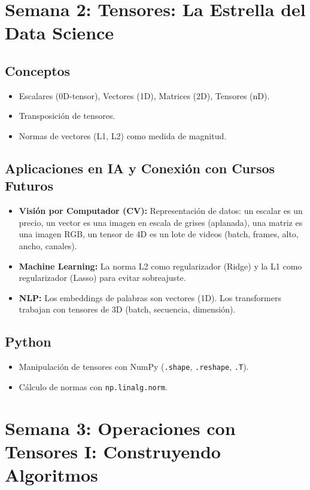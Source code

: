 \documentclass[12pt,a4paper,openany,oneside]{book}
\begin{document}
\section{Semana 2: Tensores: La Estrella del Data Science}

\subsection{Conceptos}
\begin{itemize}
    \item Escalares (0D-tensor), Vectores (1D), Matrices (2D), Tensores (nD).
    \item Transposición de tensores.
    \item Normas de vectores (L1, L2) como medida de magnitud.
\end{itemize}

\subsection{Aplicaciones en IA y Conexión con Cursos Futuros}
\begin{itemize}
    \item \textbf{Visión por Computador (CV):} Representación de datos: un escalar es un precio, un vector es una imagen en escala de grises (aplanada), una matriz es una imagen RGB, un tensor de 4D es un lote de videos (batch, frames, alto, ancho, canales).
    \item \textbf{Machine Learning:} La norma L2 como regularizador (Ridge) y la L1 como regularizador (Lasso) para evitar sobreajuste.
    \item \textbf{NLP:} Los embeddings de palabras son vectores (1D). Los transformers trabajan con tensores de 3D (batch, secuencia, dimensión).
\end{itemize}

\subsection{Python}
\begin{itemize}
    \item Manipulación de tensores con NumPy (\texttt{.shape}, \texttt{.reshape}, \texttt{.T}).
    \item Cálculo de normas con \texttt{np.linalg.norm}.
\end{itemize}

\section{Semana 3: Operaciones con Tensores I: Construyendo Algoritmos}
\end{document}
